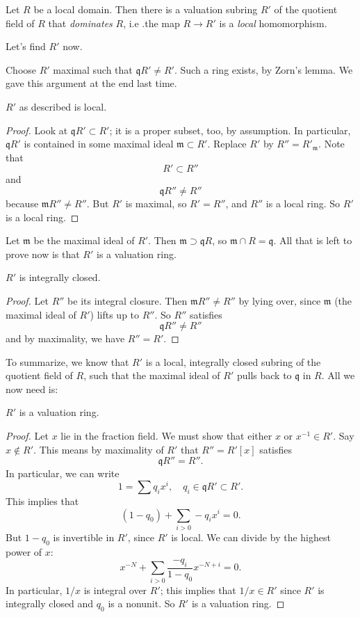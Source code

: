 \begin{lemma}
Let $R$ be a local domain. Then there is a valuation subring $R'$ of the quotient
field of $R$ that \emph{dominates} $R$, i.e .the map $R \to R'$ is a
\emph{local} homomorphism.
\end{lemma}

Let's find $R'$ now.

Choose $R'$ maximal such that $\mathfrak{q} R' \neq R'$. Such a ring exists, by
Zorn's lemma. We gave this argument at the end last time.

\begin{lemma} 
$R'$ as described is local.
\end{lemma} 
\begin{proof} 
Look at $\mathfrak{q}R' \subset R'$; it is a proper subset, too, by assumption.
In particular, $\mathfrak{q}R'$ is contained in some maximal ideal
$\mathfrak{m}\subset R'$.   Replace $R'$ by $R'' = R'_{\mathfrak{m}}$.  Note that
\[ R' \subset R''  \]
and
\[ \mathfrak{q}R'' \neq R''  \]
because $\mathfrak{m}R'' \neq R''$.  But $R'$ is maximal, so $R' = R''$, and
$R''$ is a local ring. So $R'$ is a local ring. 
\end{proof} 

Let $\mathfrak{m}$ be the maximal ideal of $R'$. Then $\mathfrak{m} \supset
\mathfrak{q}R$, so $\mathfrak{m} \cap R = \mathfrak{q}$. 
All that is left to prove now is that $R'$ is a valuation ring.  

\begin{lemma} 
$R'$ is integrally closed.
\end{lemma} 

\begin{proof} 
Let $R''$ be its integral closure. Then $\mathfrak{m} R'' \neq R''$ by lying
over, since $\mathfrak{m}$ (the maximal ideal of $R'$) lifts up to $R''$. So
$R''$ satisfies
\[ \mathfrak{q}R'' \neq R''  \]
and by maximality, we have $R'' = R'$. 
\end{proof} 

To summarize, we know that $R'$ is a  local, integrally closed subring of the
quotient field of $R$, such that the maximal ideal of $R'$ pulls back to
$\mathfrak{q}$ in $R$.
All we now need is:

\begin{lemma} 
$R'$ is a valuation ring.
\end{lemma} 
\begin{proof} 
Let $x$ lie in the fraction field. We must show that either $x$ or $x^{-1} \in
R'$.  Say $x \notin R'$.  This means by maximality of $R'$ that $R'' = R'[x]$ satisfies
\[ \mathfrak{q}R'' = R''.  \]
In particular, we can write
\[ 1 = \sum q_i x^i, \quad q_i \in \mathfrak{q}R' \subset R'.  \]
This implies that
\[ (1-q_0) + \sum_{i > 0} -q_i x^i  = 0.  \]
But $1-q_0$ is invertible in $R'$, since $R'$ is local.  We can divide by the
highest power of $x$:
\[  x^{-N} + \sum_{i>0} \frac{-q_i}{1-q_0} x^{-N+i} = 0. \]
In particular, $1/x$ is integral over $R'$; this implies that $1/x \in R'$ since
$R'$ is integrally closed and $q_0$ is a nonunit. So
$R'$ is a valuation ring. 
\end{proof} 

